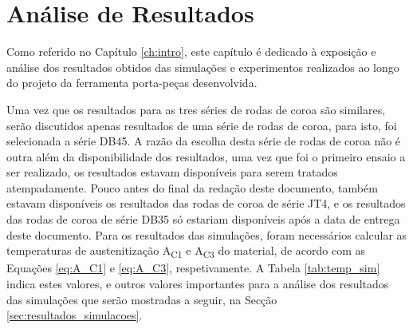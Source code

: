 \chapter{Análise de Resultados} \label{ch:resultados}
\setlength{\headheight}{13.6pt}
Como referido no Capítulo \ref{ch:intro}, este capítulo é dedicado à exposição e análise dos resultados obtidos das simulações e experimentos realizados ao longo do projeto da ferramenta porta-peças desenvolvida.
\par
Uma vez que os resultados para as tres séries de rodas de coroa são similares, serão discutidos apenas resultados de uma série de rodas de coroa, para isto, foi selecionada a série DB45. A razão da escolha desta série de rodas de coroa não é outra além da disponibilidade dos resultados, uma vez que foi o primeiro ensaio a ser realizado, os resultados estavam disponíveis para serem tratados atempadamente. Pouco antes do final da redação deste documento, também estavam disponíveis os resultados das rodas de coroa de série JT4, e os resultados das rodas de coroa de série DB35 só estariam disponíveis após a data de entrega deste documento.
Para os resultados das simulações, foram necessários calcular as temperaturas de austenitização A\textsubscript{C1} e A\textsubscript{C3} do material, de acordo com as Equações \ref{eq:A_C1} e \ref{eq:A_C3}, respetivamente. A Tabela \ref{tab:temp_sim} indica estes valores, e outros valores importantes para a análise dos resultados das simulações que serão mostradas a seguir, na Secção \ref{sec:resultados_simulacoes}.
